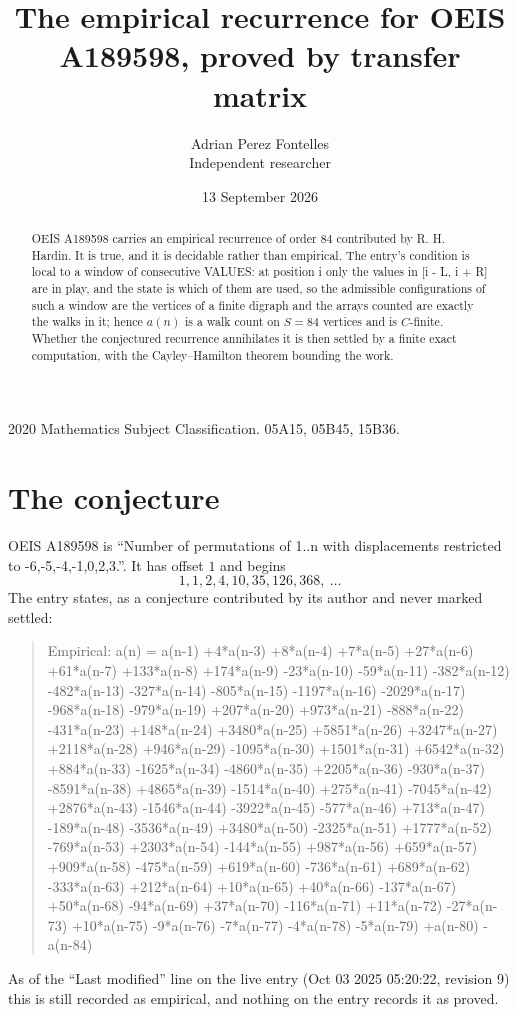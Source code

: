 \documentclass[11pt,a4paper]{article}
\title{The empirical recurrence for OEIS A189598, proved by transfer matrix}
\author{Adrian Perez Fontelles\\ \small Independent researcher}
\date{13 September 2026}
\theoremstyle{plain}
\theoremstyle{definition}
\begin{document}
\maketitle

\begin{abstract}
OEIS A189598 carries an empirical recurrence of order $84$ contributed by R. H. Hardin. It is
true, and it is decidable rather than empirical. The entry's condition is local to a window of consecutive VALUES: at position i only the values in [i - L, i + R] are in play, and the state is which of them are used, so
the admissible configurations of such a window are the vertices of a finite digraph and the
arrays counted are exactly the walks in it; hence $a(n)$ is a walk count on $S=84$ vertices
and is $C$-finite. Whether the conjectured recurrence annihilates it is then settled by a
finite exact computation, with the Cayley--Hamilton theorem bounding the work.
\end{abstract}

\noindent\small 2020 Mathematics Subject Classification. 05A15, 05B45, 15B36.\normalsize

\section{The conjecture}

OEIS A189598 is ``Number of permutations of 1..n with displacements restricted to {-6,-5,-4,-1,0,2,3}.''. It has offset $1$ and begins
\[
1, 1, 2, 4, 10, 35, 126, 368,\ \dots
\]
The entry states, as a conjecture contributed by its author and never marked settled:
\begin{quote}
Empirical: a(n) = a(n-1) +4*a(n-3) +8*a(n-4) +7*a(n-5) +27*a(n-6) +61*a(n-7) +133*a(n-8) +174*a(n-9) -23*a(n-10) -59*a(n-11) -382*a(n-12) -482*a(n-13) -327*a(n-14) -805*a(n-15) -1197*a(n-16) -2029*a(n-17) -968*a(n-18) -979*a(n-19) +207*a(n-20) +973*a(n-21) -888*a(n-22) -431*a(n-23) +148*a(n-24) +3480*a(n-25) +5851*a(n-26) +3247*a(n-27) +2118*a(n-28) +946*a(n-29) -1095*a(n-30) +1501*a(n-31) +6542*a(n-32) +884*a(n-33) -1625*a(n-34) -4860*a(n-35) +2205*a(n-36) -930*a(n-37) -8591*a(n-38) +4865*a(n-39) -1514*a(n-40) +275*a(n-41) -7045*a(n-42) +2876*a(n-43) -1546*a(n-44) -3922*a(n-45) -577*a(n-46) +713*a(n-47) -189*a(n-48) -3536*a(n-49) +3480*a(n-50) -2325*a(n-51) +1777*a(n-52) -769*a(n-53) +2303*a(n-54) -144*a(n-55) +987*a(n-56) +659*a(n-57) +909*a(n-58) -475*a(n-59) +619*a(n-60) -736*a(n-61) +689*a(n-62) -333*a(n-63) +212*a(n-64) +10*a(n-65) +40*a(n-66) -137*a(n-67) +50*a(n-68) -94*a(n-69) +37*a(n-70) -116*a(n-71) +11*a(n-72) -27*a(n-73) +10*a(n-75) -9*a(n-76) -7*a(n-77) -4*a(n-78) -5*a(n-79) +a(n-80) -a(n-84)
\end{quote}
As of the ``Last modified'' line on the live entry (Oct 03 2025 05:20:22, revision 9) this is still
recorded as empirical, and nothing on the entry records it as proved.
\end{document}
